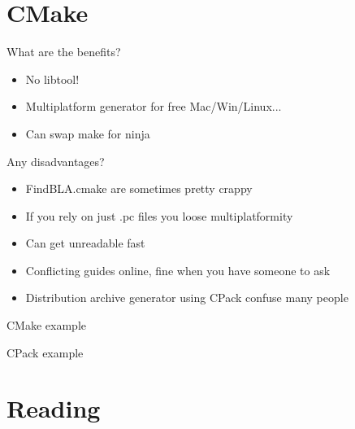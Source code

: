 \documentclass{beamer}
\begin{document}

\section{CMake}

\begin{frame}{What are the benefits?}
	\begin{itemize}
    \item No libtool!
    \item Multiplatform generator for free Mac/Win/Linux...
    \item Can swap make for ninja
	\end{itemize}
\end{frame}

\begin{frame}{Any disadvantages?}
	\begin{itemize}
    \item FindBLA.cmake are sometimes pretty crappy
    \item If you rely on just .pc files you loose multiplatformity
    \item Can get unreadable fast
    \item Conflicting guides online, fine when you have someone to ask
    \item Distribution archive generator using CPack confuse many people
	\end{itemize}
\end{frame}

\begin{frame}[t]{CMake example}
	\begin{small}
	
	\end{small}
\end{frame}

\begin{frame}[t]{CPack example}
	\begin{small}
	
	\end{small}
\end{frame}

\section{Reading}
\end{document}
